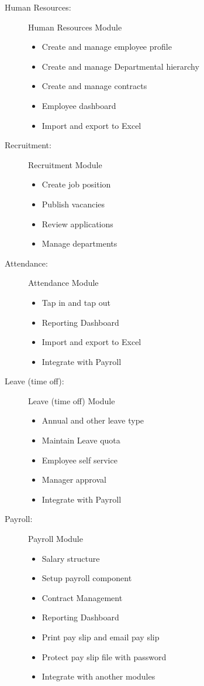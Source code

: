 \begin{description}
	\item[Human Resources:] Human Resources Module
	\begin{itemize}
		\item Create and manage employee profile
 		\item Create and manage Departmental hierarchy
 		\item Create and manage contracts
 		\item Employee dashboard
 		\item Import and export to Excel
 	\end{itemize}
 	
 	\item[Recruitment:] Recruitment Module
	\begin{itemize}
		\item Create job position
		\item Publish vacancies
		\item Review applications
		\item Manage departments
 	\end{itemize}
 	
 	\item[Attendance:] Attendance Module
	\begin{itemize}
		\item Tap in and tap out
		\item Reporting Dashboard
		\item Import and export to Excel
		\item Integrate with Payroll
 	\end{itemize}
 	
 	\item[Leave (time off):] Leave (time off) Module
	\begin{itemize}
		\item Annual and other leave type
		\item Maintain Leave quota
		\item Employee self service
		\item Manager approval
		\item Integrate with Payroll
 	\end{itemize}
 	
 	\item[Payroll:] Payroll Module
	\begin{itemize}
		\item Salary structure
		\item Setup payroll component 
		\item Contract Management
		\item Reporting Dashboard 
		\item Print pay slip and email pay slip
		\item Protect pay slip file with password
		\item Integrate with another modules
 	\end{itemize}
 	

\end{description}
